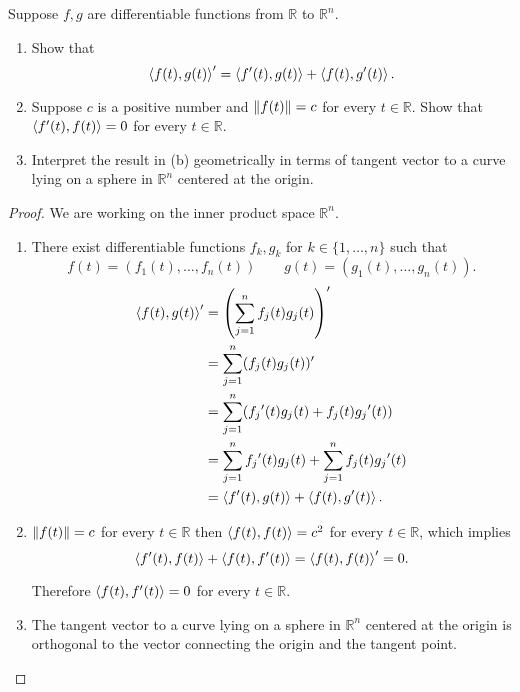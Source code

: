 \begin{exercise}
    Suppose $f, g$ are differentiable functions from $\mathbb{R}$ to $\mathbb{R}^{n}$.
    \begin{enumerate}[label={(\alph*)}]
        \item Show that
              \[
                  {\left\langle{f(t), g(t)}\right\rangle}' = \left\langle{f'(t), g(t)}\right\rangle + \left\langle{f(t), g'(t)}\right\rangle.
              \]
        \item Suppose $c$ is a positive number and $\left\Vert{f(t)}\right\Vert = c$ for every $t\in\mathbb{R}$. Show that $\left\langle{f'(t), f(t)}\right\rangle = 0$ for every $t\in\mathbb{R}$.
        \item Interpret the result in (b) geometrically in terms of tangent vector to a curve lying on a sphere in $\mathbb{R}^{n}$ centered at the origin.
    \end{enumerate}
\end{exercise}

\begin{proof}
    We are working on the inner product space $\mathbb{R}^{n}$.

    \begin{enumerate}[label={(\alph*)}]
        \item There exist differentiable functions $f_{k}, g_{k}$ for $k\in \{1, \ldots, n\}$ such that
              \[
                  f(t) = (f_{1}(t), \ldots, f_{n}(t))\qquad g(t) = (g_{1}(t), \ldots, g_{n}(t)).
              \]
              \begin{align*}
                  {\left\langle{f(t), g(t)}\right\rangle}' & = \left(\sum^{n}_{j=1} f_{j}(t)g_{j}(t)\right)'                           \\
                                            & = \sum^{n}_{j=1} (f_{j}(t)g_{j}(t))'                                      \\
                                            & = \sum^{n}_{j=1} (f_{j}{'}(t)g_{j}(t) + f_{j}(t)g_{j}{'}(t))              \\
                                            & = \sum^{n}_{j=1} f_{j}{'}(t)g_{j}(t) + \sum^{n}_{j=1} f_{j}(t)g_{j}{'}(t) \\
                                            & = \left\langle{f'(t), g(t)}\right\rangle + \left\langle{f(t), g'(t)}\right\rangle.
              \end{align*}
        \item $\left\Vert{f(t)}\right\Vert = c$ for every $t\in\mathbb{R}$ then $\left\langle{f(t), f(t)}\right\rangle = c^{2}$ for every $t\in\mathbb{R}$, which implies
              \[
                  \left\langle{f'(t), f(t)}\right\rangle + \left\langle{f(t), f'(t)}\right\rangle = \left\langle{f(t), f(t)}\right\rangle' = 0.
              \]

              Therefore $\left\langle{f(t), f'(t)}\right\rangle = 0$ for every $t\in\mathbb{R}$.
        \item The tangent vector to a curve lying on a sphere in $\mathbb{R}^{n}$ centered at the origin is orthogonal to the vector connecting the origin and the tangent point.
    \end{enumerate}
\end{proof}
\newpage

